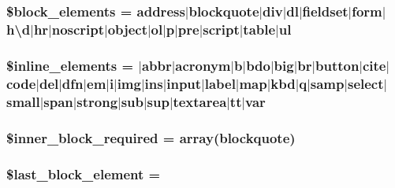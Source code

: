 \subsubsection[{\$block\+\_\+elements}]{\setlength{\rightskip}{0pt plus 5cm}\$block\+\_\+elements = \textquotesingle{}address$\vert$blockquote$\vert$div$\vert$dl$\vert$fieldset$\vert$form$\vert${\bf h\textbackslash{}d}$\vert$hr$\vert$noscript$\vert$object$\vert$ol$\vert$p$\vert$pre$\vert$script$\vert$table$\vert$ul\textquotesingle{}}\label{class_c_i___typography_ac99f5bbe8e02dc1147e9a4205dc161eb}
\hypertarget{class_c_i___typography_a7ee5f0598125dc7e6b17a08aa6da384f}{}
\subsubsection[{\$inline\+\_\+elements}]{\setlength{\rightskip}{0pt plus 5cm}\$inline\+\_\+elements = $\vert$abbr$\vert$acronym$\vert${\bf b}$\vert$bdo$\vert$big$\vert$br$\vert${\bf button}$\vert$cite$\vert$code$\vert$del$\vert$dfn$\vert$em$\vert$i$\vert$img$\vert$ins$\vert$input$\vert$label$\vert$map$\vert$kbd$\vert$q$\vert$samp$\vert$select$\vert$small$\vert$span$\vert$strong$\vert$sub$\vert$sup$\vert$textarea$\vert$tt$\vert$var\textquotesingle{}}\label{class_c_i___typography_a7ee5f0598125dc7e6b17a08aa6da384f}
\hypertarget{class_c_i___typography_a822eaf22f556c5c52bd766779d9ee22f}{}
\subsubsection[{\$inner\+\_\+block\+\_\+required}]{\setlength{\rightskip}{0pt plus 5cm}\$inner\+\_\+block\+\_\+required = array(\textquotesingle{}blockquote\textquotesingle{})}\label{class_c_i___typography_a822eaf22f556c5c52bd766779d9ee22f}
\hypertarget{class_c_i___typography_a8d5c4b7f2f7b74e118c682cf95688e22}{}
\subsubsection[{\$last\+\_\+block\+\_\+element}]{\setlength{\rightskip}{0pt plus 5cm}\$last\+\_\+block\+\_\+element = \textquotesingle{}\textquotesingle{}}\label{class_c_i___typography_a8d5c4b7f2f7b74e118c682cf95688e22}
\hypertarget{class_c_i___typography_a6a74364571da23cc7187c864cde167ca}{}
